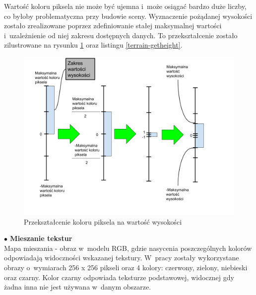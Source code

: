 \documentclass[a4paper,twoside,12pt]{book}
\begin{document}
Wartość koloru piksela nie może być ujemna i~może osiągać bardzo duże liczby, co byłoby problematyczna przy budowie sceny. Wyznaczenie pożądanej wysokości zostało zrealizowane poprzez zdefiniowanie stałej maksymalnej wartości i~uzależnienie od niej zakresu dostępnych danych. To przekształcenie zostało zilustrowane na rysunku \ref{fig:terrain_heighttransform} oraz listingu \ref{terrain-getheight}.

\begin{figure}[H]
    \centering
    \includegraphics[width=1.2\textwidth]{res/terrain_heighttransform.png}
    \caption{Przekształcenie koloru piksela na wartość wysokości}
    \label{fig:terrain_heighttransform}
\end{figure}




\vspace{\baselineskip}
\textbf{$\bullet$ Mieszanie tekstur} \\
Mapa mieszania - obraz w~modelu RGB, gdzie nasycenia poszczególnych kolorów odpowiadają widoczności wskazanej tekstury. W~pracy zostały wykorzystane obrazy o~wymiarach 256 x 256 pikseli oraz 4 kolory: czerwony, zielony, niebieski oraz czarny. Kolor czarny odpowiada teksturze podstawowej, widocznej gdy żadna inna nie jest używana w~danym obszarze.
\end{document}
